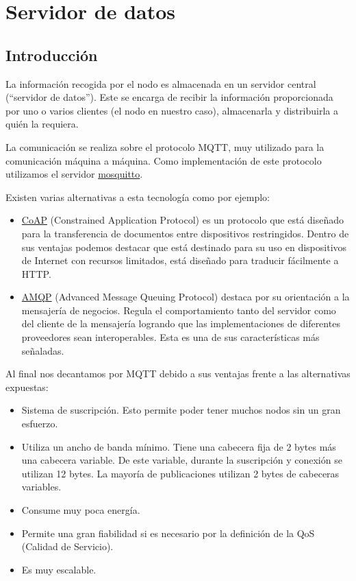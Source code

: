 \cleardoublepage

\chapter{Servidor de datos}
\label{makereference4}

\section{Introducción}
\label{makereference4.1}
La información recogida por el nodo es almacenada en un servidor central (``servidor de datos''). Este se encarga de recibir la información proporcionada por uno o varios clientes (el nodo en nuestro caso), almacenarla y distribuirla a quién la requiera.

La comunicación se realiza sobre el protocolo MQTT, muy utilizado para la comunicación máquina a máquina. Como implementación de este protocolo utilizamos el servidor \href{https://mosquitto.org/}{mosquitto}.

Existen varias alternativas a esta tecnología como por ejemplo:
\begin{itemize}
\item \href{https://en.wikipedia.org/wiki/Constrained_Application_Protocol}{CoAP} (Constrained Application Protocol) es un protocolo que está diseñado para la transferencia de documentos entre dispositivos restringidos. Dentro de sus ventajas podemos destacar que está destinado para su uso en dispositivos de Internet con recursos limitados, está diseñado para traducir fácilmente a HTTP.
\item \href{https://www.amqp.org/}{AMQP} (Advanced Message Queuing Protocol) destaca por su orientación a la mensajería de negocios. Regula el comportamiento tanto del servidor como del cliente de la mensajería logrando que las implementaciones de diferentes proveedores sean interoperables. Esta es una de sus características más señaladas.
\end{itemize}

Al final nos decantamos por MQTT debido a sus ventajas frente a las alternativas expuestas:

\begin{itemize}
\item Sistema de suscripción. Esto permite poder tener muchos nodos sin un gran esfuerzo.
\item Utiliza un ancho de banda mínimo. Tiene una cabecera fija de 2 bytes más una cabecera variable. De este variable, durante la suscripción y conexión se utilizan 12 bytes. La mayoría de publicaciones utilizan 2 bytes de cabeceras variables.
\item Consume muy poca energía.
\item Permite una gran fiabilidad si es necesario por la definición de la QoS (Calidad de Servicio).
\item Es muy escalable.
\end{itemize}

